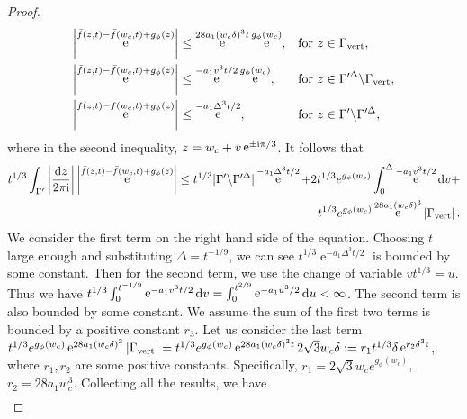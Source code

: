 \documentclass[cmp]{svjour}
\numberwithin{theorem}{section}
\numberwithin{equation}{section}
\DeclareMathOperator{\e}{e}
\def\dd{{\rm d}}
\def\ii{{\rm i}}
\def\i{{\infty}}
\begin{document}
\begin{proof}
\begin{subequations}\label{fbar bound}
\begin{align}
\label{fbar bound1}
\left| \e^{\bar{f}(z,t) - \bar{f}(w_c, t) + g_{\phi}(z) } \right| &\leq \e^{28 a_1 (w_c \delta)^3t} \e^{g_{\phi}(w_c)}, 
&\textrm{for }& z\in \Gamma_{\rm vert},
\\
\label{fbar bound2}
\left|	\e^{\bar{f}(z,t) - \bar{f}(w_c, t) + g_{\phi}(z) }  \right| &\leq  \e^{-a_1 v^3 t /2} \e^{g_{\phi}(w_c)},
&\textrm{for }& z\in \Gamma'^{\Delta} \backslash \Gamma_{\rm vert},
\\
\label{fbar bound3}
\left| \e^{f(z,t) - f(w_c,t) + g_{\phi}(z)}  \right| &\leq \e^{- a_1 \Delta^3 t /2},
&\textrm{for }& z\in \Gamma' \backslash \Gamma'^{\Delta},
\end{align}
\end{subequations}
where in the second inequality, $z = w_c +v \e^{ \pm \ii \pi /3}$. It follows that 
\begin{equation*}
	\begin{split}
		t^{1/3}\int_{\Gamma'} \left|\frac{\dd z }{2 \pi \ii}\right|	\left| \e^{\bar{f}(z,t)-\bar{f}(w_c,t) + g_{\phi}(z)} \right| \leq t^{1/3} |\Gamma' \backslash \Gamma'^{\Delta}| \e^{- a_1 \Delta^3 t /2} + 2 t^{1/3} e^{g_{\phi}(w_c)} \int_0^{\Delta} \e^{-a_1 v^3 t /2} \dd v + \\ t^{1/3} e^{g_{\phi}(w_c)} \e^{28 a_1 (w_c \delta)^3} \left| \Gamma_{\rm vert}\right|.
	\end{split}
\end{equation*}
We consider the first term on the right hand side of the equation. Choosing $t$ large enough and substituting $\Delta=t^{-1/9}$, we can see  $t^{1/3}\e^{-a_1\Delta^3t/2} $ is bounded by some constant. Then for the second term, we use the change of variable $vt^{1/3} = u$. Thus we have $t^{1/3} \int^{t^{-1/9}}_0 \e^{-a_1 v^3 t/2} \dd v = \int^{t^{2/9}}_0 \e^{-a_1u^3/2} \dd u < \i$. The second term is also bounded by some constant. We assume the sum of the first two terms is bounded by a positive constant $r_3$. Let us consider the last term $t^{1/3} e^{g_{\phi}(w_c)} \e^{28 a_1 (w_c \delta)^3} \left| \Gamma_{\rm vert}\right| = t^{1/3} e^{g_{\phi}(w_c)} \e^{28 a_1 (w_c \delta)^3 t} 2 \sqrt{3} w_c \delta := r_1 t^{1/3}\delta \e^{ r_2 \delta^3 t}$, where $r_1,r_2$ are some positive constants. Specifically,  $r_1=2\sqrt{3} w_ce^{g_{\phi}(w_c)} $, $r_2=28 a_1 w_c^3$. Collecting all the results, we have
\begin{equation*}
	\begin{split}

\end{split}
\end{equation*}
\end{proof}
\end{document}
